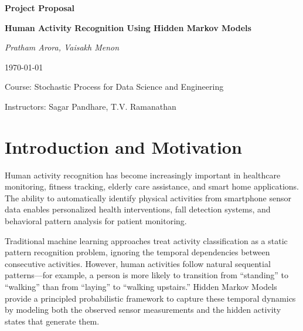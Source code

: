 \documentclass[11pt,a4paper]{article}
\begin{document}
\begin{titlepage}
    \centering
    \vspace*{2cm}
    
    {\LARGE\bfseries Project Proposal\par}
    \vspace{1cm}
    {\Huge\bfseries Human Activity Recognition Using Hidden Markov Models\par}
    \vspace{2cm}
    
    {\Large\itshape Pratham Arora, Vaisakh Menon\par}
    
    {\large \today\par}
    
    \vfill
    
    {\large Course: Stochastic Process for Data Science and Engineering\par}
    {\large Instructors: Sagar Pandhare, T.V. Ramanathan\par}
    
\end{titlepage}

\tableofcontents
\newpage

\section{Introduction and Motivation}

Human activity recognition has become increasingly important in healthcare monitoring, fitness tracking, elderly care assistance, and smart home applications. The ability to automatically identify physical activities from smartphone sensor data enables personalized health interventions, fall detection systems, and behavioral pattern analysis for patient monitoring.

Traditional machine learning approaches treat activity classification as a static pattern recognition problem, ignoring the temporal dependencies between consecutive activities. However, human activities follow natural sequential patterns—for example, a person is more likely to transition from ``standing'' to ``walking'' than from ``laying'' to ``walking upstairs.'' Hidden Markov Models provide a principled probabilistic framework to capture these temporal dynamics by modeling both the observed sensor measurements and the hidden activity states that generate them.
\end{document}

